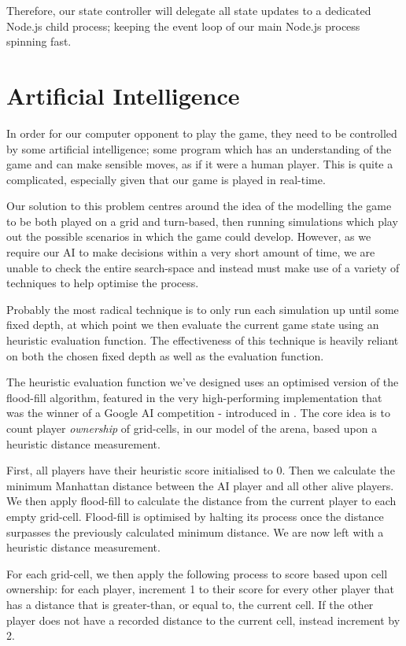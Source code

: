 \documentclass{standalone}
\begin{document}
			Therefore, our state controller will delegate all state updates to a dedicated Node.js child process; keeping the event loop of our main Node.js process spinning fast.

	\section{Artificial Intelligence} \label{sec:design-ai}
		In order for our computer opponent to play the game, they need to be controlled by some artificial intelligence; some program which has an understanding of the game and can make sensible moves, as if it were a human player. This is quite a complicated, especially given that our game is played in real-time.

		Our solution to this problem centres around the idea of the modelling the game to be both played on a grid and turn-based, then running simulations which play out the possible scenarios in which the game could develop. However, as we require our AI to make decisions within a very short amount of time, we are unable to check the entire search-space and instead must make use of a variety of techniques to help optimise the process.

		Probably the most radical technique is to only run each simulation up until some fixed depth, at which point we then evaluate the current game state using an heuristic evaluation function. The effectiveness of this technique is heavily reliant on both the chosen fixed depth as well as the evaluation function.

		The heuristic evaluation function we've designed uses an optimised version of the flood-fill algorithm, featured in the very high-performing implementation that was the winner of a Google AI competition - introduced in . The core idea is to count player \emph{ownership} of grid-cells, in our model of the arena, based upon a heuristic distance measurement.

		First, all players have their heuristic score initialised to 0. Then we calculate the minimum Manhattan distance between the AI player and all other alive players. We then apply flood-fill to calculate the distance from the current player to each empty grid-cell. Flood-fill is optimised by halting its process once the distance surpasses the previously calculated minimum distance. We are now left with a heuristic distance measurement.

		For each grid-cell, we then apply the following process to score based upon cell ownership: for each player, increment 1 to their score for every other player that has a distance that is greater-than, or equal to, the current cell. If the other player does not have a recorded distance to the current cell, instead increment by 2.
\end{document}
